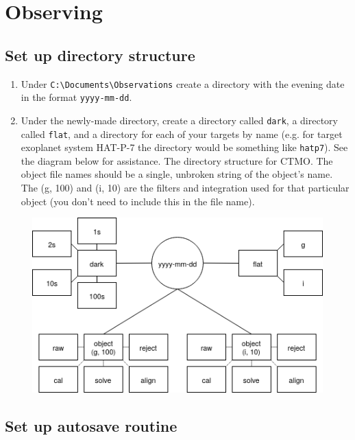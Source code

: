 \documentclass{article}
\begin{document}
	\newpage
	\section{Observing}
	
	\subsection{Set up directory structure}
	
		\begin{enumerate}
			
			\item Under \texttt{C:\textbackslash Documents\textbackslash Observations} create a directory with the evening date in the format \texttt{yyyy-mm-dd}.
			
			\item Under the newly-made directory, create a directory called \texttt{dark}, a directory called \texttt{flat}, and a directory for each of your targets by name (e.g. for target exoplanet system HAT-P-7 the directory would be something like \texttt{hatp7}). See the diagram below for assistance. The directory structure for CTMO. The object file names should be a single, unbroken string of the object's name. The (g, 100) and (i, 10) are the filters and integration used for that particular object (you don't need to include this in the file name).
			
		\end{enumerate}
	
		\begin{figure}[h]
			\centering
			\includegraphics[scale=0.5]{images/ctmo_format.png}
		\end{figure}
	
	\subsection{Set up autosave routine}
		
\end{document}
